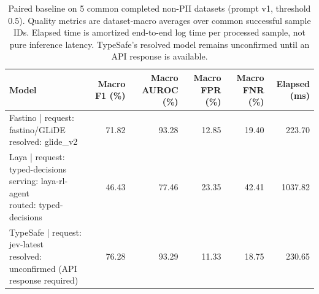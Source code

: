\begin{table}[t]
\centering
\small
\begin{tabular}{lrrrrr}
\toprule
Model & Macro F1 (\%) & Macro AUROC (\%) & Macro FPR (\%) & Macro FNR (\%) & Elapsed (ms) \\
\midrule
\shortstack[l]{Fastino | request: fastino/GLiDE\\resolved: glide\_v2} & 71.82 & 93.28 & 12.85 & 19.40 & 223.70 \\
\shortstack[l]{Laya | request: typed-decisions\\serving: laya-rl-agent\\routed: typed-decisions} & 46.43 & 77.46 & 23.35 & 42.41 & 1037.82 \\
\shortstack[l]{TypeSafe | request: jev-latest\\resolved: unconfirmed (API response required)} & 76.28 & 93.29 & 11.33 & 18.75 & 230.65 \\
\bottomrule
\end{tabular}
\caption{Paired baseline on 5 common completed non-PII datasets (prompt v1, threshold 0.5). Quality metrics are dataset-macro averages over common successful sample IDs. Elapsed time is amortized end-to-end log time per processed sample, not pure inference latency. TypeSafe's resolved model remains unconfirmed until an API response is available.}
\label{tab:model-comparison}
\end{table}
